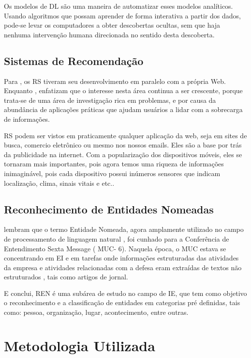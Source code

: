 \documentclass[12pt]{article}
\begin{document}
Os modelos de DL são uma maneira de automatizar esses modelos analíticos. Usando algoritmos que possam aprender de forma interativa a partir dos dados, pode-se levar os computadores a obter descobertas ocultas, sem que haja nenhuma intervenção humana direcionada no sentido desta descoberta.

\subsection{Sistemas de Recomendação}

Para \cite{Bobadilla2013109}, os RS  tiveram seu desenvolvimento em paralelo com a própria Web. Enquanto \cite{Adomavicius:2005:TNG:1070611.1070751}, enfatizam que o interesse nesta área continua a ser crescente, porque trata-se de uma área de investigação rica em problemas, e por causa da abundância de aplicações práticas que ajudam usuários a lidar com a sobrecarga de informações.

RS podem ser vistos em praticamente qualquer aplicação da web, seja em sites de busca, comercio eletrônico ou mesmo nos nossos emails. Eles são a base por trás da publicidade na internet. Com a popularização dos dispositivos móveis, eles se tornaram mais importantes, pois agora temos uma riqueza de informações inimaginável, pois cada dispositivo possui inúmeros sensores que indicam localização, clima, sinais vitais e etc..


\subsection{Reconhecimento de Entidades Nomeadas}

\cite{nadeau2007survey} lembram que o termo Entidade Nomeada, agora amplamente utilizado no campo de processamento de linguagem natural , foi cunhado para a Conferência de Entendimento Sexta Message ( MUC- 6). Naquela época, o MUC estava se concentrando em EI e em tarefas onde informações estruturadas das atividades da empresa e atividades relacionadas com a defesa eram extraídas de textos não estruturados , tais como artigos de jornal. 
			
E \cite{Zaccara2012} conclui, REN é uma subárea de estudo no campo de IE, que tem como objetivo o reconhecimento e a classificação de entidades em categorias pré definidas, tais como: pessoa, organização, lugar, acontecimento, entre outras.

\section{Metodologia Utilizada}
\end{document}
